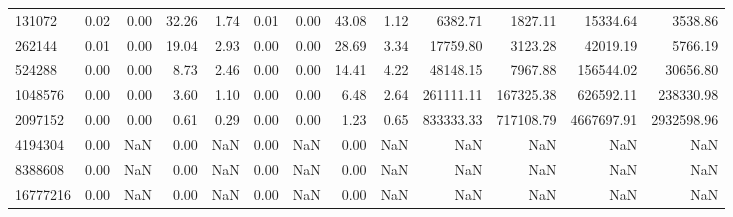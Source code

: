 \begin{tabular}{lrrrrrrrrrrrr}
131072 & 0.02 & 0.00 & 32.26 & 1.74 & 0.01 & 0.00 & 43.08 & 1.12 & 6382.71 & 1827.11 & 15334.64 & 3538.86 \\
262144 & 0.01 & 0.00 & 19.04 & 2.93 & 0.00 & 0.00 & 28.69 & 3.34 & 17759.80 & 3123.28 & 42019.19 & 5766.19 \\
524288 & 0.00 & 0.00 & 8.73 & 2.46 & 0.00 & 0.00 & 14.41 & 4.22 & 48148.15 & 7967.88 & 156544.02 & 30656.80 \\
1048576 & 0.00 & 0.00 & 3.60 & 1.10 & 0.00 & 0.00 & 6.48 & 2.64 & 261111.11 & 167325.38 & 626592.11 & 238330.98 \\
2097152 & 0.00 & 0.00 & 0.61 & 0.29 & 0.00 & 0.00 & 1.23 & 0.65 & 833333.33 & 717108.79 & 4667697.91 & 2932598.96 \\
4194304 & 0.00 & NaN & 0.00 & NaN & 0.00 & NaN & 0.00 & NaN & NaN & NaN & NaN & NaN \\
8388608 & 0.00 & NaN & 0.00 & NaN & 0.00 & NaN & 0.00 & NaN & NaN & NaN & NaN & NaN \\
16777216 & 0.00 & NaN & 0.00 & NaN & 0.00 & NaN & 0.00 & NaN & NaN & NaN & NaN & NaN \\
\bottomrule
\end{tabular}
